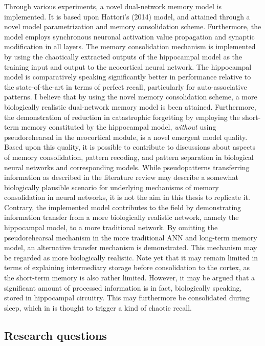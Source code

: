 Through various experiments, a novel dual-network memory model is implemented. It is based upon Hattori's (2014) model, and attained through a novel model parametrization and memory consolidation scheme. Furthermore, the model employs synchronous neuronal activation value propagation and synaptic modification in all layers. The memory consolidation mechanism is implemented by using the chaotically extracted outputs of the hippocampal model as the training input and output to the neocortical neural network. The hippocampal model is comparatively speaking significantly better in performance relative to the state-of-the-art in terms of perfect recall, particularly for auto-associative patterns. I believe that by using the novel memory consolidation scheme, a more biologically realistic dual-network memory model is been attained. Furthermore, the demonstration of reduction in catastrophic forgetting by employing the short-term memory constituted by the hippocampal model, \textit{without} using pseudorehearsal in the neocortical module, is a novel emergent model quality. Based upon this quality, it is possible to contribute to discussions about aspects of memory consolidation, pattern recoding, and pattern separation in biological neural networks and corresponding models.
While pseudopatterns transferring information as described in the literature review may describe a somewhat biologically plausible scenario for underlying mechanisms of memory consolidation in neural networks, it is not the aim in this thesis to replicate it. Contrary, the implemented model contributes to the field by demonstrating information transfer from a more biologically realistic network, namely the hippocampal model, to a more traditional network. By omitting the pseudorehearsal mechanism in the more traditional ANN and long-term memory model, an alternative transfer mechanism is demonstrated. This mechanism may be regarded as more biologically realistic.
Note yet that it may remain limited in terms of explaining intermediary storage before consolidation to the cortex, as the short-term memory is also rather limited. However, it may be argued that a significant amount of processed information is in fact, biologically speaking, stored in hippocampal circuitry. This may furthermore be consolidated during sleep, which in is thought to trigger a kind of chaotic recall.


\subsection*{Research questions}

